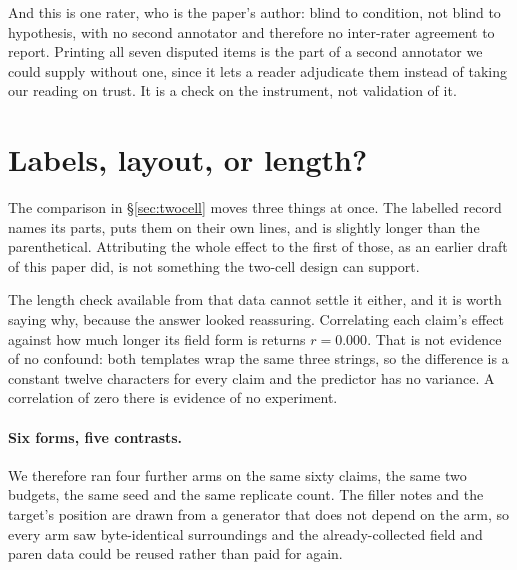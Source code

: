 \documentclass[11pt]{article}
\begin{document}
And this is one rater, who is the paper's author: blind to condition, not blind to
hypothesis, with no second annotator and therefore no inter-rater agreement to report.
Printing all seven disputed items is the part of a second annotator we could supply
without one, since it lets a reader adjudicate them instead of taking our reading on
trust. It is a check on the instrument, not validation of it.

\section{Labels, layout, or length?}
\label{sec:ablation}

The comparison in \S\ref{sec:twocell} moves three things at once. The labelled record
names its parts, puts them on their own lines, and is slightly longer than the
parenthetical. Attributing the whole effect to the first of those, as an earlier draft of
this paper did, is not something the two-cell design can support.

The length check available from that data cannot settle it either, and it is worth saying
why, because the answer looked reassuring. Correlating each claim's effect against how
much longer its field form is returns $r=0.000$. That is not evidence of no confound: both
templates wrap the same three strings, so the difference is a constant twelve characters
for every claim and the predictor has no variance. A correlation of zero there is evidence
of no experiment.

\paragraph{Six forms, five contrasts.} We therefore ran four further arms on the
same sixty claims, the same two budgets, the same seed and the same replicate count. The
filler notes and the target's position are drawn from a generator that does not depend on
the arm, so every arm saw byte-identical surroundings and the already-collected field and
paren data could be reused rather than paid for again.
\end{document}
